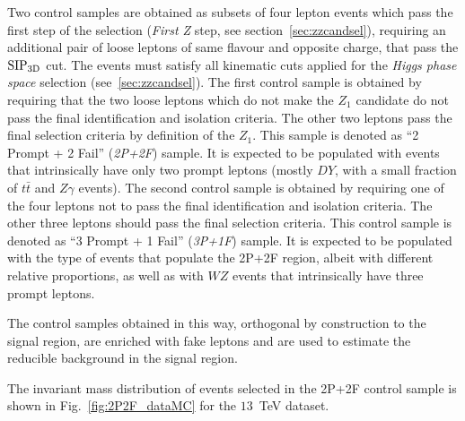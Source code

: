 Two control samples are obtained as subsets of four lepton events
which pass the first step of the selection ({\it First Z} step, see
section~\ref{sec:zzcandsel}), requiring an additional pair of 
loose leptons of same flavour 
and opposite charge, that pass the ${\rm SIP_{3D}}$ cut. 
The events must satisfy all kinematic cuts applied for the {\it Higgs phase space} selection
(see~\ref{sec:zzcandsel}).
The first control sample is obtained by
requiring that the two loose leptons which do not make the $Z_1$ candidate 
do not pass the final identification and
isolation criteria.
The other two leptons pass
the final selection criteria by definition of the $Z_1$. 
This sample is denoted as ``2 Prompt + 2
Fail'' ({\it 2P+2F}) sample. It is expected to be populated with
events that intrinsically have only two prompt leptons 
(mostly $DY$, with a small fraction of $t \bar{t}$ and $Z \gamma$ events).
The second control sample is obtained by requiring one of
the four leptons not to pass the final identification and isolation
criteria.
The other three
leptons should pass the final selection criteria. This control sample
is denoted as ``3 Prompt + 1 Fail'' ({\it 3P+1F}) sample. It is
expected to be populated with the type of events that populate the
2P+2F region, 
albeit with different relative proportions,
as well as with $WZ$ events that intrinsically have three
prompt leptons.


The control samples obtained in this way, orthogonal by construction
to the signal region, are enriched with fake leptons and are used to
estimate the reducible background in the signal
region. 

The invariant mass distribution of events selected in the 2P+2F control sample
is shown in Fig.~\ref{fig:2P2F_dataMC} for the $13$~TeV dataset. 

